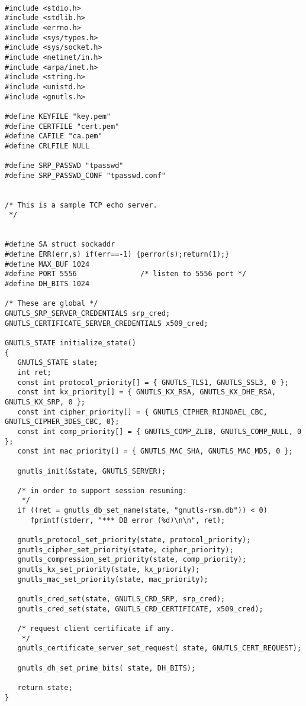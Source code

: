 \begin{verbatim}

#include <stdio.h>
#include <stdlib.h>
#include <errno.h>
#include <sys/types.h>
#include <sys/socket.h>
#include <netinet/in.h>
#include <arpa/inet.h>
#include <string.h>
#include <unistd.h>
#include <gnutls.h>

#define KEYFILE "key.pem"
#define CERTFILE "cert.pem"
#define CAFILE "ca.pem"
#define CRLFILE NULL

#define SRP_PASSWD "tpasswd"
#define SRP_PASSWD_CONF "tpasswd.conf"


/* This is a sample TCP echo server.
 */


#define SA struct sockaddr
#define ERR(err,s) if(err==-1) {perror(s);return(1);}
#define MAX_BUF 1024
#define PORT 5556               /* listen to 5556 port */
#define DH_BITS 1024

/* These are global */
GNUTLS_SRP_SERVER_CREDENTIALS srp_cred;
GNUTLS_CERTIFICATE_SERVER_CREDENTIALS x509_cred;

GNUTLS_STATE initialize_state()
{
   GNUTLS_STATE state;
   int ret;
   const int protocol_priority[] = { GNUTLS_TLS1, GNUTLS_SSL3, 0 };
   const int kx_priority[] = { GNUTLS_KX_RSA, GNUTLS_KX_DHE_RSA, GNUTLS_KX_SRP, 0 };
   const int cipher_priority[] = { GNUTLS_CIPHER_RIJNDAEL_CBC, GNUTLS_CIPHER_3DES_CBC, 0};
   const int comp_priority[] = { GNUTLS_COMP_ZLIB, GNUTLS_COMP_NULL, 0 };
   const int mac_priority[] = { GNUTLS_MAC_SHA, GNUTLS_MAC_MD5, 0 };

   gnutls_init(&state, GNUTLS_SERVER);

   /* in order to support session resuming:
    */
   if ((ret = gnutls_db_set_name(state, "gnutls-rsm.db")) < 0)
      fprintf(stderr, "*** DB error (%d)\n\n", ret);

   gnutls_protocol_set_priority(state, protocol_priority);
   gnutls_cipher_set_priority(state, cipher_priority);
   gnutls_compression_set_priority(state, comp_priority);
   gnutls_kx_set_priority(state, kx_priority);
   gnutls_mac_set_priority(state, mac_priority);

   gnutls_cred_set(state, GNUTLS_CRD_SRP, srp_cred);
   gnutls_cred_set(state, GNUTLS_CRD_CERTIFICATE, x509_cred);

   /* request client certificate if any.
    */
   gnutls_certificate_server_set_request( state, GNUTLS_CERT_REQUEST);

   gnutls_dh_set_prime_bits( state, DH_BITS);
   
   return state;
}


\end{verbatim}
